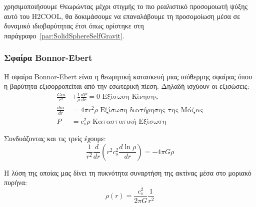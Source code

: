 χρησιμοποιήσουμε 
Θεωρώντας μέχρι στιγμής το πιο ρεαλιστικό προσομοιωτή ψύξης αυτό του H2COOL, θα δοκιμάσουμε να επαναλάβουμε τη προσομοίωση μέσα σε δυναμικό ιδιοβαρύτητας έτσι όπως ορίστηκε στη παράγραφο~\ref{par:SolidSphereSelfGravit}. 
%
%	
%	
	
	\subsubsection{Σφαίρα Bonnor-Ebert}
	Η σφαίρα Bonnor-Ebert είναι η θεωρητική κατασκευή μιας ισόθερμης σφαίρας όπου η βαρύτητα εξισορροπείται από την εσωτερική πίεση. Δηλαδή ισχύουν οι εξισώσεις:
	\begin{align}
	\frac{Gm}{r^2} &+\frac{1}{\rho}\frac{dP}{dr}=0 \text{ Εξίσωση Κίνησης}\\
	\frac{dm}{dr} &= 4 \pi r^2 \rho \text{ Εξίσωση διατήρησης της Μάζας}\\
	P &= c_s ^2 \rho \text{ Καταστατική Εξίσωση}
	\end{align}
	
	Συνδυάζοντας και τις τρείς έχουμε:
	\begin{equation}
	\frac{1}{r^2}\frac{d}{dr} \left( r^2 c_s ^2 \frac{d \ln \rho}{dr}\right)  = -4 \pi G \rho
	\end{equation}
	
	Η λύση της οποίας μας δίνει τη πυκνότητα συναρτήση της ακτίνας μέσα στο μοριακό πυρήνα:
	\begin{equation}
	\label{eq:B-E_density}
	\rho (r) =\frac{c_s ^2}{2 \pi G} \frac{1}{r^2}
	\end{equation}
	
	
